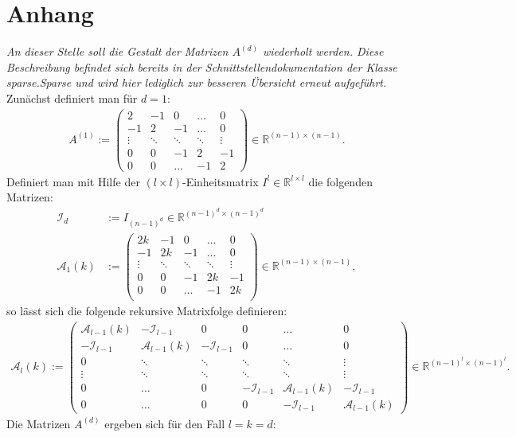 \documentclass[smallheadings]{scrartcl}
\numberwithin{equation}{section}
\begin{document}
\section{Anhang}\label{sec:anhang}
\emph{An dieser Stelle soll die Gestalt der Matrizen $A^{(d)}$ wiederholt werden. Diese Beschreibung befindet sich bereits in der Schnittstellendokumentation der Klasse \emph{sparse.Sparse} und wird hier lediglich zur besseren Übersicht erneut aufgeführt.}\newline
\newline
Zunächst definiert man für $d=1$:
\begin{align}
A^{(1)}:= 
\begin{pmatrix}
2 & -1 & 0 & \dots & 0\\
-1 & 2 & -1 & \dots & 0\\
\vdots & \ddots & \ddots & \ddots & \vdots\\
0 & 0 & -1 & 2 & -1\\
0 & 0 & \dots & -1 & 2
\end{pmatrix}\in \mathbb{R}^{(n-1)\times(n-1)}.
\label{eq:a_1_def}
\end{align}
Definiert man mit Hilfe der $(l\times l)$-Einheitsmatrix $I^l\in \mathbb{R}^{l\times l}$ die folgenden Matrizen:
\begin{align}
\mathcal{I}_d&:=I_{(n-1)^d}\in\mathbb{R}^{(n-1)^d\times(n-1)^d}\\
\mathcal{A}_1(k)&:=
\begin{pmatrix}
2k & -1 & 0 & \dots & 0\\
-1 & 2k & -1 & \dots & 0\\
\vdots & \ddots & \ddots & \ddots & \vdots \\
0 & 0 & -1 & 2k & -1\\
0 & 0 & \dots & -1 & 2k\\
\end{pmatrix} \in \mathbb{R}^{(n-1)\times(n-1)},
\end{align}
so lässt sich die folgende rekursive Matrixfolge definieren:
\begin{align}
\mathcal{A}_l(k):=
\begin{pmatrix}
\mathcal{A}_{l-1}(k) & -\mathcal{I}_{l-1} & 0 & 0 & \dots & 0\\
-\mathcal{I}_{l-1} & \mathcal{A}_{l-1}(k) & -\mathcal{I}_{l-1} & 0 & \dots & 0\\
0 & \ddots & \ddots & \ddots & \ddots & \vdots \\
\vdots & \ddots & \ddots & \ddots & \ddots & \vdots \\
0 & \dots & 0 & -\mathcal{I}_{l-1} & \mathcal{A}_{l-1}(k) & -\mathcal{I}_{l-1} \\
0 & \dots & 0 & 0 & -\mathcal{I}_{l-1} & \mathcal{A}_{l-1}(k)
\end{pmatrix} \in \mathbb{R}^{(n-1)^l\times(n-1)^l}.
\end{align}
Die Matrizen $A^{(d)}$ ergeben sich für den Fall $l=k=d$:
\end{document}
